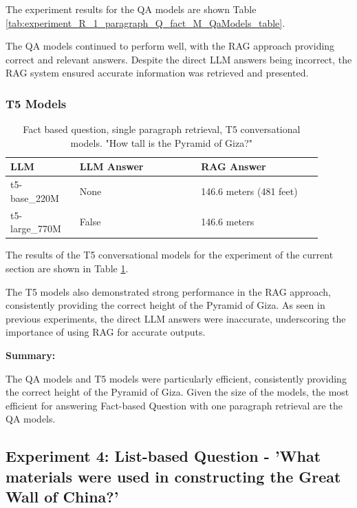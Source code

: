 \documentclass{wseas}
\begin{document}
The experiment results for the QA models are shown Table \ref{tab:experiment_R_1_paragraph_Q_fact_M_QaModels_table}.

The QA models continued to perform well, with the RAG approach providing
correct and relevant answers. Despite the direct LLM answers being
incorrect, the RAG system ensured accurate information was retrieved and
presented.

\subsubsection{T5 Models}


\begin{table}[htbp]
  \centering
  \caption{Fact based question, single paragraph retrieval, T5 conversational models. "How tall is the Pyramid of Giza?"} %
  \label{tab:experiment_R_1_paragraph_Q_fact_M_T5Models_table}
  \begin{tabular}{|p{0.20\linewidth}|p{0.35\linewidth}|p{0.35\linewidth}|}
    \hline
    \textbf{LLM} & \textbf{LLM Answer} & \textbf{RAG Answer} \\ \hline
    t5-base\_220M & None & 146.6 meters (481 feet) \\ \hline
    t5-large\_770M & False & 146.6 meters \\ \hline
  \end{tabular}
\end{table}

The results of the T5 conversational models for the experiment of the current section 
are shown in Table \ref{tab:experiment_R_1_paragraph_Q_fact_M_T5Models_table}.

The T5 models also demonstrated strong performance in the RAG approach,
consistently providing the correct height of the Pyramid of Giza. As
seen in previous experiments, the direct LLM answers were inaccurate,
underscoring the importance of using RAG for accurate outputs.

\textbf{Summary:}

The QA models and T5 models were particularly efficient, consistently
providing the correct height of the Pyramid of Giza. Given the size of
the models, the most efficient for answering Fact-based Question with
one paragraph retrieval are the QA models.

\subsection{Experiment 4: List-based Question - 'What materials were
used in constructing the Great Wall of China?'}
\end{document}
